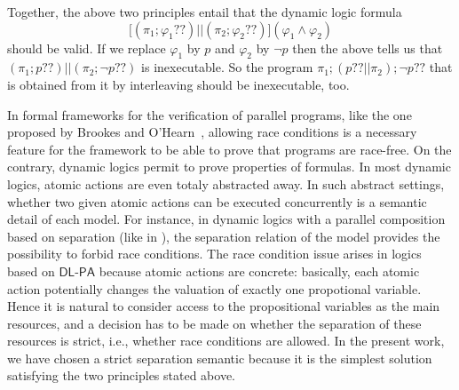\documentclass{llncs}
\newcommand{\pll}{ {||} }							%
\newcommand{\testendo}{?\!\!?}			%
\newcommand{\Dlpa}{\ensuremath{\mathsf{DL\text{-}PA}}\xspace}
\newcommand{\ah}[1]{\footnote{\textbf{AH:} #1}}
\newcommand{\lbox}[1]{ \big[ #1 \big] }
\renewcommand{\phi}{\varphi}
\begin{document}
Together, the above two principles entail that the dynamic logic formula
$$ \lbox{ (\pi_1 ; \phi_1 \testendo ) \pll (\pi_2 ; \phi_2 \testendo ) } (\phi_1 \land \phi_2) $$
should be valid. 
If we replace $\phi_1$ by $p$ and $\phi_2$ by $\lnot p$ then the above tells us that 
$(\pi_1 ; p \testendo ) \pll (\pi_2 ; \lnot p \testendo )$ is inexecutable. 
So the program
$\pi_1 ; (p \testendo \pll \pi_2) ; \lnot p \testendo $ 
that is obtained from it by interleaving should be inexecutable, too. 

In formal frameworks for the verification of parallel programs, like the one proposed by Brookes
and O'Hearn~\cite{Brookes04,OHearn04}, allowing race conditions is a necessary feature for the
framework to be able to prove that programs are race-free.
On the contrary, dynamic logics permit to prove properties of formulas.
In most dynamic logics, atomic actions are even totaly abstracted away.
In such abstract settings,
whether two given atomic actions can be executed concurrently is a semantic detail of each model.
For instance, in dynamic logics with a parallel composition based on separation (like in
\cite{DBLP:journals/entcs/BenevidesFV11,Boudou16,DBLP:journals/logcom/BalbianiB18}),
the separation relation of the model provides the possibility to forbid race conditions.
The race condition issue arises in logics based on \Dlpa because atomic actions are concrete:
basically, each atomic action potentially changes the valuation of exactly one propotional variable.
Hence it is natural to consider access to the propositional variables as the main resources,
and a decision has to be made on whether the separation of these resources is strict,
i.e., whether race conditions are allowed.
In the present work, we have chosen a strict separation semantic because it is the simplest solution satisfying
the two principles stated above.
\end{document}
